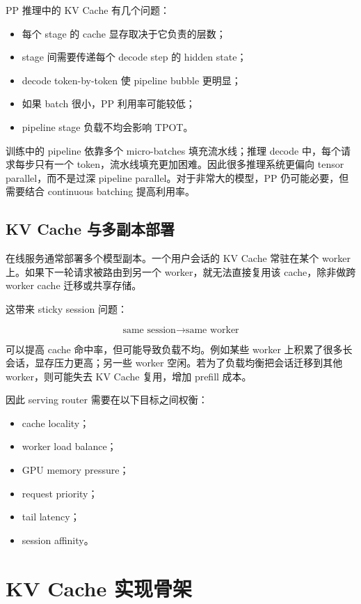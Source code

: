 PP 推理中的 KV Cache 有几个问题：

\begin{itemize}
\item 每个 stage 的 cache 显存取决于它负责的层数；
\item stage 间需要传递每个 decode step 的 hidden state；
\item decode token-by-token 使 pipeline bubble 更明显；
\item 如果 batch 很小，PP 利用率可能较低；
\item pipeline stage 负载不均会影响 TPOT。
\end{itemize}

训练中的 pipeline 依靠多个 micro-batches 填充流水线；推理 decode 中，每个请求每步只有一个 token，流水线填充更加困难。因此很多推理系统更偏向 tensor parallel，而不是过深 pipeline parallel。对于非常大的模型，PP 仍可能必要，但需要结合 continuous batching 提高利用率。

\subsection{KV Cache 与多副本部署}
\label{subsec:kv-cache-and-replica-serving}

在线服务通常部署多个模型副本。一个用户会话的 KV Cache 常驻在某个 worker 上。如果下一轮请求被路由到另一个 worker，就无法直接复用该 cache，除非做跨 worker cache 迁移或共享存储。

这带来 sticky session 问题：

\[
\text{same session}
\rightarrow
\text{same worker}
\]

可以提高 cache 命中率，但可能导致负载不均。例如某些 worker 上积累了很多长会话，显存压力更高；另一些 worker 空闲。若为了负载均衡把会话迁移到其他 worker，则可能失去 KV Cache 复用，增加 prefill 成本。

因此 serving router 需要在以下目标之间权衡：

\begin{itemize}
\item cache locality；
\item worker load balance；
\item GPU memory pressure；
\item request priority；
\item tail latency；
\item session affinity。
\end{itemize}

\section{KV Cache 实现骨架}
\label{sec:kv-cache-implementation-skeleton}


